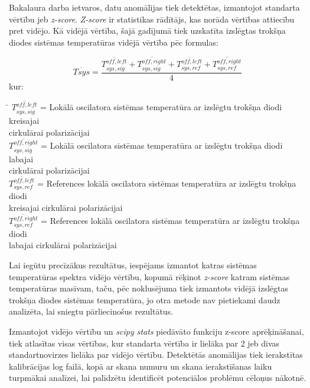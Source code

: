 Bakalaura darba ietvaros, datu anomālijas tiek detektētas, izmantojot standarta vērtību jeb \textit{z-score}. \textit{Z-score} ir statistikas rādītājs, kas norāda vērtības attiecību pret vidējo. Kā vidējā vērtība, šajā gadījumā tiek uzskatīta izslēgtas trokšņa diodes sistēmas temperatūras vidējā vērtība pēc formulas:

\begin{equation}
\overline{Tsys} = \frac{\overline{T_{sys,sig}^{off,left}} + \overline{T_{sys,sig}^{off,right}} + \overline{T_{sys,ref}^{off,left}} +  \overline{T_{sys,ref}^{off,right}} }{4} \tag{1.7.1}\label{eq:1.7.1} 
\end{equation}
kur: 
\begin{tabbing}
\phantom{\hspace{20mm}}\= \kill
$\overline{T_{sys,sig}^{off,left}}$\> = Lokālā oscilatora sistēmas temperatūra ar izslēgtu trokšņa diodi kreisajai \\ cirkulārai polarizācijai\\
$\overline{T_{sys,sig}^{off,right}}$\> = Lokālā oscilatora sistēmas temperatūra ar izslēgtu trokšņa diodi labajai \\ cirkulārai polarizācijai\\
$\overline{T_{sys,ref}^{off,left}}$\>   = References lokālā oscilatora sistēmas temperatūra ar izslēgtu trokšņa diodi \\ kreisajai cirkulārai polarizācijai\\
$\overline{T_{sys,ref}^{off,right}}$\>   = References lokālā oscilatora sistēmas temperatūra ar izslēgtu trokšņa diodi \\labajai cirkulārai polarizācijai\\
\end{tabbing}

Lai iegūtu precīzākus rezultātus, iespējams izmantot katras sistēmas temperatūras spektra vidējo vērtību, kopumā rēķinot \textit{z-score} katram sistēmas temperatūras masīvam, taču, pēc noklusējuma tiek izmantots vidējā izslēgtas trokšņa diodes sistēmas temperatūra, jo otra metode nav pietiekami daudz analizēta, lai sniegtu pārliecinošus rezultātus.

Izmantojot vidējo vērtību un \textit{scipy stats} piedāvāto funkciju z-score aprēķināšanai, tiek atlasītas visas vērtības, kur standarta vērtība ir lielāka par 2 jeb divas standartnovirzes lielāka par vidējo vērtību. Detektētās anomālijas tiek ierakstītas kalibrācijas log failā, kopā ar skana numuru un skana ierakstīšanas laiku turpmākai analīzei, lai palīdzētu identificēt potenciālos problēmu cēloņus nākotnē.


